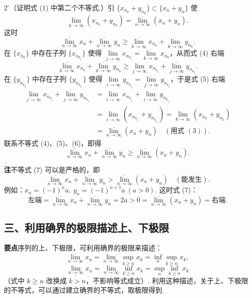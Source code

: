 \documentclass[UTF8,12pt,a4paper,fontset=fandol]{ctexart}
\begin{document}
$2^\circ$（证明式 (1) 中第二个不等式.）引 $\{x_{n_k}+y_{n_k}\}\subset\{x_n+y_n\}$ 使
\[
  \lim_{k\to\infty}(x_{n_k}+y_{n_k})=\overline{\lim_{n\to\infty}}(x_n+y_n).
\tag{3}
\]
这时
\[
  \overline{\lim_{n\to\infty}}x_n+\overline{\lim_{n\to\infty}}y_n
  \ge \overline{\lim_{k\to\infty}}x_{n_k}+\overline{\lim_{k\to\infty}}y_{n_k}.
\tag{4}
\]
在 $\{x_{n_k}\}$ 中存在子列 $\{x_{n_{k_j}}\}$ 使得 $\lim\limits_{j\to\infty}x_{n_{k_j}}=\overline{\lim\limits_{k\to\infty}}x_{n_k}$，从而式 (4) 右端
\[
  \overline{\lim_{k\to\infty}}x_{n_k}+\overline{\lim_{k\to\infty}}y_{n_k}
  \ge \lim_{j\to\infty}x_{n_{k_j}}+\overline{\lim_{j\to\infty}}y_{n_{k_j}}.
\tag{5}
\]
在 $\{y_{n_{k_j}}\}$ 中存在子列 $\{y_{n_{k_{j_i}}}\}$ 使得 $\lim\limits_{i\to\infty}y_{n_{k_{j_i}}}=\overline{\lim\limits_{j\to\infty}}y_{n_{k_j}}$，于是式 (5) 右端
\[
\begin{aligned}
  \lim_{j\to\infty}x_{n_{k_j}}+\overline{\lim_{j\to\infty}}y_{n_{k_j}}
  &=\lim_{i\to\infty}x_{n_{k_{j_i}}}+\lim_{i\to\infty}y_{n_{k_{j_i}}} \\
  &=\lim_{i\to\infty}(x_{n_{k_{j_i}}}+y_{n_{k_{j_i}}})
   =\lim_{k\to\infty}(x_{n_k}+y_{n_k}) \\
  &=\overline{\lim_{n\to\infty}}(x_n+y_n)\quad(\text{用式 }(3)).
\end{aligned}
\tag{6}
\]
联系不等式 (4)、(5)、(6)，即得
\[
  \overline{\lim_{n\to\infty}}x_n+\overline{\lim_{n\to\infty}}y_n
  \ge \overline{\lim_{n\to\infty}}(x_n+y_n).
\tag{7}
\]

\noindent\textbf{注}\quad 不等式 (7) 可以是严格的，即
\[
  \overline{\lim_{n\to\infty}}x_n+\overline{\lim_{n\to\infty}}y_n
  >\overline{\lim_{n\to\infty}}(x_n+y_n)\quad(\text{能发生}).
\]
例如：$x_n=(-1)^n a,\ y_n=(-1)^{n+1}a\ (a>0)$. 这时式 (7)：
\[
  \text{左端}=\overline{\lim_{n\to\infty}}x_n+\overline{\lim_{n\to\infty}}y_n=2a>0
  =\overline{\lim_{n\to\infty}}(x_n+y_n)=\text{右端}.
\]

\subsection*{三、利用确界的极限描述上、下极限}

\noindent\textbf{要点}\quad 序列的上、下极限，可利用确界的极限来描述：
\[
  \overline{\lim_{n\to\infty}}x_n=\lim_{n\to\infty}\sup_{k\ge n}x_k=\inf_n\sup_{k\ge n}x_k,
\]
\[
  \underline{\lim_{n\to\infty}}x_n=\lim_{n\to\infty}\inf_{k\ge n}x_k=\sup_n\inf_{k\ge n}x_k
\]
（式中 $k\ge n$ 改换成 $k>n$，不影响等式成立）. 利用这种描述，关于上、下极限的不等式，可以通过建立确界的不等式，取极限得到.
\end{document}
